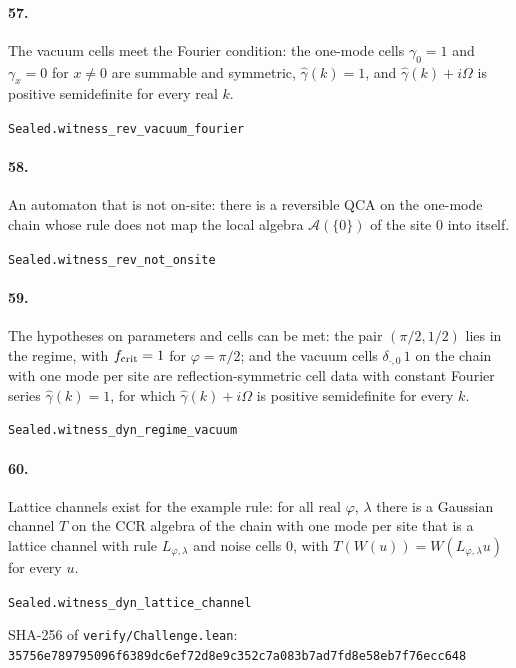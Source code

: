 \documentclass[11pt]{article}
\begin{document}
\paragraph{57.} The vacuum cells meet the Fourier condition: the one-mode cells $\gamma_0 = 1$ and $\gamma_x = 0$ for $x \neq 0$ are summable and symmetric, $\hat\gamma(k) = 1$, and $\hat\gamma(k) + i\Omega$ is positive semidefinite for every real $k$.\par{\footnotesize\texttt{Sealed.witness\_rev\_vacuum\_fourier}}

\paragraph{58.} An automaton that is not on-site: there is a reversible QCA on the one-mode chain whose rule does not map the local algebra $\mathcal A(\{0\})$ of the site $0$ into itself.\par{\footnotesize\texttt{Sealed.witness\_rev\_not\_onsite}}

\paragraph{59.} The hypotheses on parameters and cells can be met: the pair $(\pi/2, 1/2)$ lies in the regime, with $f_{\rm crit} = 1$ for $\varphi = \pi/2$; and the vacuum cells $\delta_{\cdot, 0}\, 1$ on the chain with one mode per site are reflection-symmetric cell data with constant Fourier series $\hat\gamma(k) = 1$, for which $\hat\gamma(k) + i\Omega$ is positive semidefinite for every $k$.\par{\footnotesize\texttt{Sealed.witness\_dyn\_regime\_vacuum}}

\paragraph{60.} Lattice channels exist for the example rule: for all real $\varphi$, $\lambda$ there is a Gaussian channel $T$ on the CCR algebra of the chain with one mode per site that is a lattice channel with rule $L_{\varphi, \lambda}$ and noise cells $0$, with $T(W(u)) = W(L_{\varphi, \lambda} u)$ for every $u$.\par{\footnotesize\texttt{Sealed.witness\_dyn\_lattice\_channel}}

\vfill{\footnotesize SHA-256 of \texttt{verify/Challenge.lean}: \texttt{35756e789795096f6389dc6ef72d8e9c352c7a083b7ad7fd8e58eb7f76ecc648}}
\end{document}
